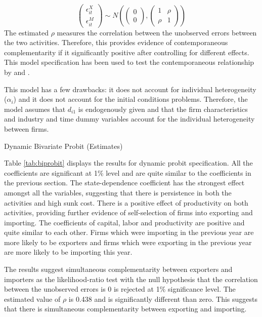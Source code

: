 \documentclass[11pt]{article}
\begin{document}
\[\begin{pmatrix}
\epsilon_{it}^{X} \\
\epsilon_{it}^{M}
\end{pmatrix}\sim N\left(\begin{pmatrix}
0 \\
0
\end{pmatrix},\begin{pmatrix}
1 & \rho \\
\rho & 1
\end{pmatrix}\right)
\]
The estimated $\rho$ measures the correlation between the unobserved
errors between the two activities. Therefore, this provides evidence
of contemporaneous complementarity if it significantly positive after
controlling for different effects. 
This model specification has been used to test the contemporaneous relationship
by \textcite{aristei2013firms} and \textcite{aw2011}. 

This model has a few drawbacks: it does not account for individual
heterogeneity ($\alpha_{i}$) and it does not account for the  initial
conditions problems. Therefore, the model assumes that $d_{i1}$ is 
endogenously given and that the firm characteristics and industry and time  dummy variables account
for the individual heterogeneity between firms.
\begin{center}
\begin{table}[H]
\caption{Dynamic Bivariate Probit (Estimates)}
\label{tab:biprobit}

\end{table}
\end{center} 
Table \ref{tab:biprobit} displays the results for dynamic probit specification. All
  the coefficients are significant at 1\% level and are quite similar
  to the coefficients in the previous section.  The
  state-dependence coefficient has the strongest effect amongst all
  the variables, suggesting that there is persistence in both the
  activities and high sunk cost. There is a positive effect of 
  productivity on both activities, providing further evidence of
  self-selection of firms into exporting and importing. The
  coefficients of capital, labor and productivity are positive and
  quite similar to each other. Firms which were importing in the previous year are more
  likely to be exporters and firms which were exporting in the
  previous year are more likely to be importing this year.


The results suggest  simultaneous complementarity between exporters and
  importers as the likelihood-ratio test with the null hypothesis that
  the correlation between the unobserved errors is 0 is rejected at
  1\% significance level. The estimated value of $\rho$ is 0.438 and
  is significantly different than zero. This suggests that there is
  simultaneous complementarity between exporting and importing. 
\end{document}
